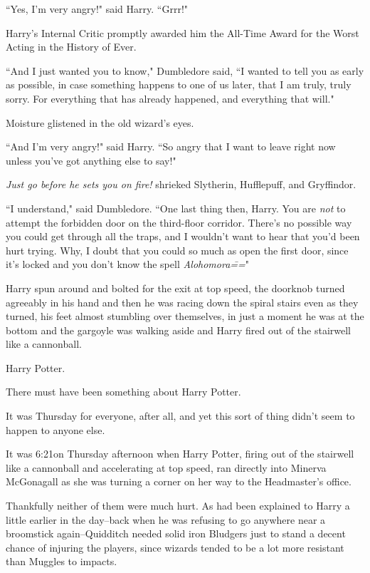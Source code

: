 ``Yes, I'm very angry!" said Harry. ``Grrr!"

Harry's Internal Critic promptly awarded him the All-Time Award for the Worst Acting in the History of Ever.

``And I just wanted you to know," Dumbledore said, ``I wanted to tell you as early as possible, in case something happens to one of us later, that I am truly, truly sorry. For everything that has already happened, and everything that will."

Moisture glistened in the old wizard's eyes.

``And I'm very angry!" said Harry. ``So angry that I want to leave right now unless you've got anything else to say!"

\emph{Just \emph{go} before he sets you on fire!} shrieked Slytherin, Hufflepuff, and Gryffindor.

``I understand," said Dumbledore. ``One last thing then, Harry. You are \emph{not} to attempt the forbidden door on the third-floor corridor. There's no possible way you could get through all the traps, and I wouldn't want to hear that you'd been hurt trying. Why, I doubt that you could so much as open the first door, since it's locked and you don't know the spell \emph{Alohomora\===}"

Harry spun around and bolted for the exit at top speed, the doorknob turned agreeably in his hand and then he was racing down the spiral stairs even as they turned, his feet almost stumbling over themselves, in just a moment he was at the bottom and the gargoyle was walking aside and Harry fired out of the stairwell like a cannonball.

\later

Harry Potter.

There must have been something about Harry Potter.

It was Thursday for everyone, after all, and yet this sort of thing didn't seem to happen to anyone else.

It was 6:21\pm on Thursday afternoon when Harry Potter, firing out of the stairwell like a cannonball and accelerating at top speed, ran directly into Minerva McGonagall as she was turning a corner on her way to the Headmaster's office.

Thankfully neither of them were much hurt. As had been explained to Harry a little earlier in the day\---back when he was refusing to go anywhere near a broomstick again\---Quidditch needed solid iron Bludgers just to stand a decent chance of injuring the players, since wizards tended to be a lot more resistant than Muggles to impacts.

